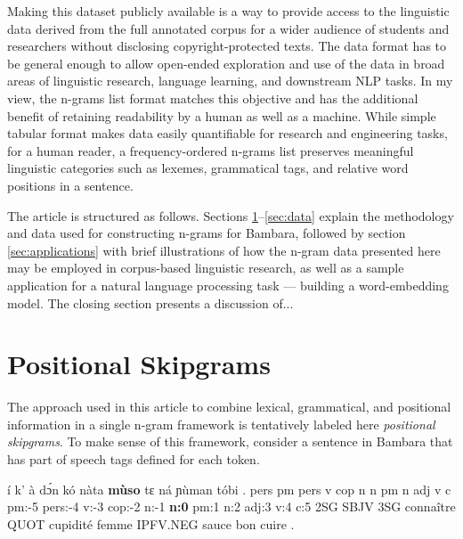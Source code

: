 \documentclass[12pt]{article}
\begin{document}
Making this dataset publicly available is a way to provide access to
the linguistic data derived from the full annotated corpus for a wider
audience of students and researchers without disclosing
copyright-protected texts. The data format has to be general enough to
allow open-ended exploration and use of the data in broad areas of
linguistic research, language learning, and downstream NLP tasks. In
my view, the n-grams list format matches this objective
and has the additional benefit of retaining readability by a human as
well as a machine. While simple tabular format makes data easily
quantifiable for research and engineering tasks, for a human reader, a
frequency-ordered n-grams list preserves meaningful linguistic
categories such as lexemes, grammatical tags, and relative word positions in
a sentence. %


The article is structured as follows. Sections
\ref{sec:definition}--\ref{sec:data} explain the methodology and data
used for constructing n-grams for Bambara, followed by section
\ref{sec:applications} with brief illustrations of how the
n-gram data presented here may be employed in corpus-based linguistic
research, as well as a sample application for a natural language
processing task — building a word-embedding model.  The closing
section presents a discussion of...


\section{Positional Skipgrams}
\label{sec:definition}

The approach used in this article to combine lexical, grammatical, and
positional information in a single n-gram framework is tentatively
labeled here \textit{positional skipgrams}.  To make sense of this
framework, consider a sentence in Bambara that has part of speech tags
defined for each token.

\begin{example}
  \label{ex:muso}
  \trigloss
  {í       k'      à       dɔ́n     kó      nàta    \textbf{mùso}    tɛ      ná      ɲùman   tóbi    .}
  {pers    pm      pers    v       cop     n       n       pm      n       adj     v       c}
  {{} pm:-5 pers:-4 v:-3 cop:-2 n:-1 \textbf{n:0} pm:1 n:2 adj:3 v:4 c:5}
  {2SG     SBJV    3SG     connaître       QUOT    cupidité        femme IPFV.NEG        sauce   bon     cuire   .}
\end{example}
\end{document}
